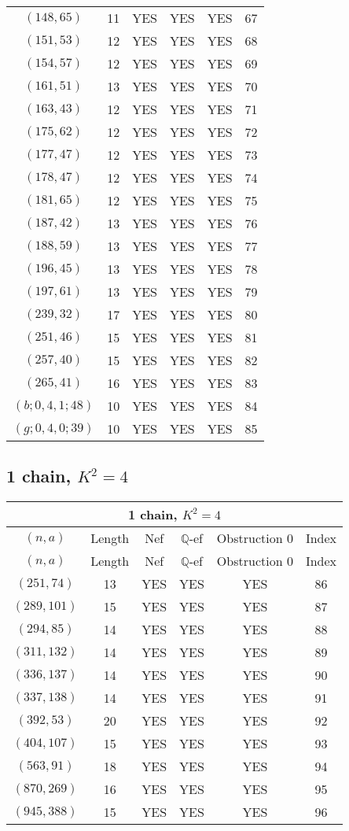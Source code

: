 \begin{longtable}{|c|c|c|c|c|c|}
$(148, 65)$ & 11 & YES & YES & YES & 67\\
$(151, 53)$ & 12 & YES & YES & YES & 68\\
$(154, 57)$ & 12 & YES & YES & YES & 69\\
$(161, 51)$ & 13 & YES & YES & YES & 70\\
$(163, 43)$ & 12 & YES & YES & YES & 71\\
$(175, 62)$ & 12 & YES & YES & YES & 72\\
$(177, 47)$ & 12 & YES & YES & YES & 73\\
$(178, 47)$ & 12 & YES & YES & YES & 74\\
$(181, 65)$ & 12 & YES & YES & YES & 75\\
$(187, 42)$ & 13 & YES & YES & YES & 76\\
$(188, 59)$ & 13 & YES & YES & YES & 77\\
$(196, 45)$ & 13 & YES & YES & YES & 78\\
$(197, 61)$ & 13 & YES & YES & YES & 79\\
$(239, 32)$ & 17 & YES & YES & YES & 80\\
$(251, 46)$ & 15 & YES & YES & YES & 81\\
$(257, 40)$ & 15 & YES & YES & YES & 82\\
$(265, 41)$ & 16 & YES & YES & YES & 83\\
$(b; 0, 4, 1; 48)$ & 10 & YES & YES & YES & 84\\
$(g; 0, 4, 0; 39)$ & 10 & YES & YES & YES & 85
\end{longtable}
\subsection{1 chain, $K^2 = 4$}
\begin{longtable}{|c|c|c|c|c|c|}
\hline
\multicolumn{6}{|c|}{1 chain, $K^2 = 4$}\\
\hline
$(n,a)$ & Length & Nef & $\mathbb Q$-ef & Obstruction 0 & Index\\
\hline
\endfirsthead

\hline
$(n,a)$ & Length & Nef & $\mathbb Q$-ef & Obstruction 0 & Index\\
\hline
\endhead
\hline
\endfoot

$(251, 74)$ & 13 & YES & YES & YES & 86\\
$(289, 101)$ & 15 & YES & YES & YES & 87\\
$(294, 85)$ & 14 & YES & YES & YES & 88\\
$(311, 132)$ & 14 & YES & YES & YES & 89\\
$(336, 137)$ & 14 & YES & YES & YES & 90\\
$(337, 138)$ & 14 & YES & YES & YES & 91\\
$(392, 53)$ & 20 & YES & YES & YES & 92\\
$(404, 107)$ & 15 & YES & YES & YES & 93\\
$(563, 91)$ & 18 & YES & YES & YES & 94\\
$(870, 269)$ & 16 & YES & YES & YES & 95\\
$(945, 388)$ & 15 & YES & YES & YES & 96
\end{longtable}
